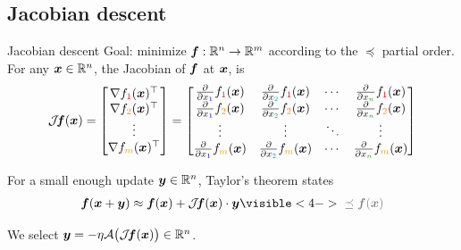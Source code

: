 \documentclass[aspectratio=169]{beamer}
\begin{document}
\subsection{Jacobian descent}
\begin{frame}{Jacobian descent}
Goal: minimize ${\boldsymbol{f}} : {\mathbb R}^n \to {\mathbb R}^m$ according to the $\preceq$ partial order.
\pause
For any ${\boldsymbol{x}}\in{\mathbb R}^n$, the Jacobian of ${\boldsymbol{f}}$ at ${\boldsymbol{x}}$, is
\begin{align*}
  \jac \vf(\vx)=
  \begin{bmatrix}
    \nabla f_{\textcolor[HTML]{FF0000}{1}}(\vx)^\T\\
    \nabla f_{\textcolor[HTML]{FF8000}{2}}(\vx)^\T\\
    \vdots\\
    \nabla f_{\textcolor[HTML]{DDAA00}{m}}(\vx)^\T
  \end{bmatrix}
  =
  \begin{bmatrix}
    \frac{\partial}{\partial x_{\textcolor[HTML]{0000FF}{1}}} f_{\textcolor[HTML]{FF0000}{1}}(\vx)&\frac{\partial}{\partial x_{\textcolor[HTML]{00AACC}{2}}} f_{\textcolor[HTML]{FF0000}{1}}(\vx)&\cdots&\frac{\partial}{\partial x_{\textcolor[HTML]{00AA00}{n}}} f_{\textcolor[HTML]{FF0000}{1}}(\vx)\\
    \frac{\partial}{\partial x_{\textcolor[HTML]{0000FF}{1}}} f_{\textcolor[HTML]{FF8000}{2}}(\vx)&\frac{\partial}{\partial x_{\textcolor[HTML]{00AACC}{2}}} f_{\textcolor[HTML]{FF8000}{2}}(\vx)&\cdots&\frac{\partial}{\partial x_{\textcolor[HTML]{00AA00}{n}}} f_{\textcolor[HTML]{FF8000}{2}}(\vx)\\
    \vdots&\vdots&\ddots&\vdots\\
    \frac{\partial}{\partial x_{\textcolor[HTML]{0000FF}{1}}} f_{\textcolor[HTML]{DDAA00}{m}}(\vx)&\frac{\partial}{\partial x_{\textcolor[HTML]{00AACC}{2}}} f_{\textcolor[HTML]{DDAA00}{m}}(\vx)&\cdots&\frac{\partial}{\partial x_{\textcolor[HTML]{00AA00}{n}}} f_{\textcolor[HTML]{DDAA00}{m}}(\vx)\\
  \end{bmatrix}
\end{align*}

\pause
For a small enough update ${\boldsymbol{y}}\in{\mathbb R}^n$, Taylor's theorem states
\begin{align*}
\vf(\vx+\vy)\approx\vf(\vx)+ \jac \vf(\vx)\cdot \vy \visible<4->{\textcolor{gray}{{}\preceq \vf(\vx)}}
\end{align*}

\pause
\pause
We select ${\boldsymbol{y}}=-\eta\mathcal{A}\big(\mathcal{J}\kern-2pt {\boldsymbol{f}}({\boldsymbol{x}})\big)\in{\mathbb R}^n$.

\end{frame}
\end{document}
